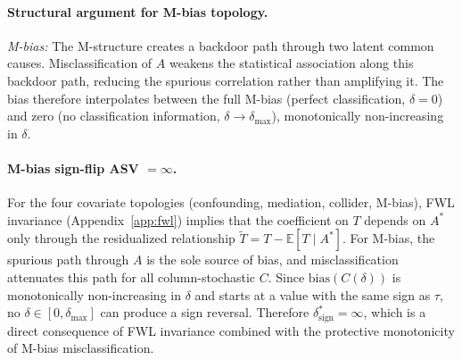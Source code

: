 \begin{table}[H]
\centering
\small
{}
\caption{Sufficient conditions for sign preservation under non-differential misclassification.}
\label{tab:sign_conditions}
\end{table}

\paragraph{Structural argument for M-bias topology.}
\emph{M-bias:} The M-structure creates a backdoor path through two latent common causes.
Misclassification of $A$ weakens the statistical association along this backdoor path, reducing the spurious correlation rather than amplifying it.
The bias therefore interpolates between the full M-bias (perfect classification, $\delta{=}0$) and zero (no classification information, $\delta{\to}\delta_{\max}$), monotonically non-increasing in $\delta$.

\paragraph{M-bias sign-flip ASV $= \infty$.}
For the four covariate topologies (confounding, mediation, collider, M-bias), FWL invariance (Appendix~\ref{app:fwl}) implies that the coefficient on $T$ depends on $A^*$ only through the residualized relationship $\tilde{T} = T - \mathbb{E}[T \mid A^*]$. For M-bias, the spurious path through $A$ is the sole source of bias, and misclassification attenuates this path for all column-stochastic $C$. Since $\text{bias}(C(\delta))$ is monotonically non-increasing in $\delta$ and starts at a value with the same sign as $\tau$, no $\delta \in [0, \delta_{\max}]$ can produce a sign reversal. Therefore $\delta^*_{\text{sign}} = \infty$, which is a direct consequence of FWL invariance combined with the protective monotonicity of M-bias misclassification.

